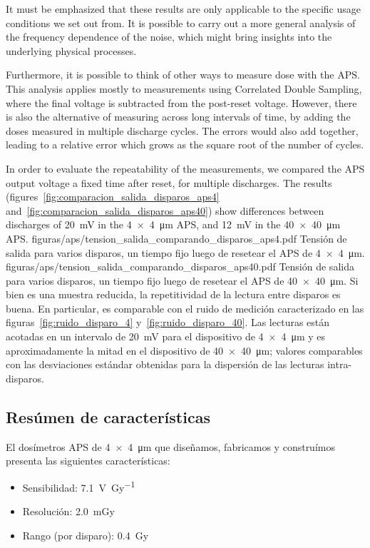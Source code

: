It must be emphasized that these results are only applicable to the specific usage conditions we set out from.
It is possible to carry out a more general analysis of the frequency dependence of the noise,
which might bring insights into the underlying physical processes.

Furthermore, it is possible to think of other ways to measure dose with the APS.
This analysis applies mostly to measurements using Correlated Double Sampling,
where the final voltage is subtracted from the post-reset voltage.
However, there is also the alternative of measuring across long intervals of time,
by adding the doses measured in multiple discharge cycles.
The errors would also add together,
leading to a relative error which grows as the square root of the number of cycles.

In order to evaluate the repeatability of the measurements,
we compared the APS output voltage a fixed time after reset,
for multiple discharges.
The results (figures~\ref{fig:comparacion_salida_disparos_aps4} and~\ref{fig:comparacion_salida_disparos_aps40})
show differences between discharges of
\SI{20}{\milli\volt} in the \SI{4x4}{\micro\meter} APS,
and \SI{12}{\milli\volt} in the \SI{40x40}{\micro\meter} APS.
{figuras/aps/tension_salida_comparando_disparos_aps4.pdf}
{Tensión de salida para varios disparos, un tiempo fijo luego de resetear el APS de \SI{4x4}{\micro\meter}.}
{figuras/aps/tension_salida_comparando_disparos_aps40.pdf}
{Tensión de salida para varios disparos, un tiempo fijo luego de resetear el APS de \SI{40x40}{\micro\meter}.}
Si bien es una muestra reducida, la repetitividad de la lectura entre disparos es buena.
En particular, es comparable con el ruido de medición caracterizado en las figuras~\ref{fig:ruido_disparo_4} y~\ref{fig:ruido_disparo_40}.
Las lecturas están acotadas en un intervalo de \SI{20}{\milli\volt} para el dispositivo de \SI{4x4}{\micro\meter} y es aproximadamente la mitad en el dispositivo de \SI{40x40}{\micro\meter}; valores comparables con las desviaciones estándar obtenidas para la dispersión de las lecturas intra-disparos.
%
\subsection{Resúmen de características}
El dosímetros APS de \SI{4x4}{\micro\meter} que diseñamos, 
fabricamos y construímos presenta las
siguientes características:
\begin{itemize}
    \item Sensibilidad: \SI{7.1}{\volt\per\gray}
    \item Resolución: \SI{2.0}{\milli\gray}
    \item Rango (por disparo): \SI{0.4}{\gray}
\end{itemize}
%

